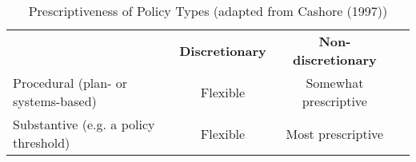 \begin{table}[h!]
\renewcommand{\arraystretch}{1.5} 
\centering
\caption{Prescriptiveness of Policy Types (adapted from Cashore (1997))}
\label{prescriptiveness}
\begin{tabular}{lccc}
 & \textbf{Discretionary} & \textbf{Non-discretionary} \\
 \cline{2-3} 
Procedural (plan- or systems-based) & Flexible & Somewhat prescriptive \\
 \cline{2-3} 
Substantive (e.g. a policy threshold) & Flexible & Most prescriptive \\
 \cline{2-3} 
\end{tabular}
\end{table}